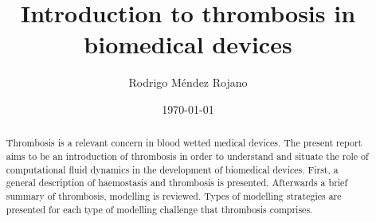 \documentclass[%
 nofootinbib,
 amsmath,amssymb,
 aps,
 pra,
]{revtex4-1}
\begin{document}
\title{Introduction to thrombosis in biomedical devices}%
\author{Rodrigo M\'{e}ndez Rojano}
%
\date{\today}%
\begin{abstract}
Thrombosis is a relevant concern in blood wetted medical devices. The present report aims to be an introduction of thrombosis in order to understand and situate the role of computational fluid dynamics in the development of biomedical devices. First, a general description of haemostasis and thrombosis is presented. Afterwards a brief summary of thrombosis, modelling is reviewed. Types of modelling strategies are presented for each type of modelling challenge that thrombosis comprises.  
\end{abstract}
\maketitle
\tableofcontents
\pagebreak
\printnomenclature
\end{document}
